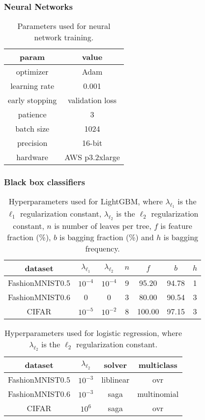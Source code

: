 \documentclass{article} %
\begin{document}
\subsubsection{Neural Networks}
\begin{table}\begin{tabular}{cc} param & value\\\hline
optimizer & Adam\\
learning rate & 0.001\\
early stopping & validation loss\\
patience & 3\\
batch size & 1024\\
precision & 16-bit\\
hardware & AWS p3.2xlarge
\end{tabular}\caption{Parameters used for neural network training. \label{tab:nn}}\end{table}

\subsubsection{Black box classifiers}
\begin{table}\begin{tabular}{ccccccc} dataset & $\lambda_{\ell_1}$ & $\lambda_{\ell_2}$ & $n$ & $f$ & $b$ & $h$\\\hline
FashionMNIST0.5 & $10^{-4}$ & $10^{-4}$ & 9 & 95.20 & 94.78 & 1\\
FashionMNIST0.6 & 0 & 0 & 3 & 80.00 & 90.54 & 3\\
CIFAR & $10^{-5}$ & $10^{-2}$ & 8 & 100.00 & 97.15 & 3
\end{tabular}\caption{
  Hyperparameters used for LightGBM, where $\lambda_{\ell_1}$ is the $\ell_1$ regularization constant, $\lambda_{\ell_2}$ is the $\ell_2$ regularization constant, $n$ is number of leaves per tree, $f$ is feature fraction (\%), $b$ is bagging fraction (\%) and $h$ is bagging frequency.
  \label{tab:lgb}
}\end{table}

\begin{table}\begin{tabular}{cccc} dataset & $\lambda_{\ell_2}$ & solver & multiclass\\\hline
FashionMNIST0.5 & $10^{-3}$ & liblinear & ovr\\
FashionMNIST0.6 & $10^{-3}$ & saga & multinomial\\
CIFAR & $10^6$ & saga & ovr
\end{tabular}\caption{
  Hyperparameters used for logistic regression, where $\lambda_{\ell_2}$ is the $\ell_2$ regularization constant.
  \label{tab:lr}
}\end{table}
\end{document}
